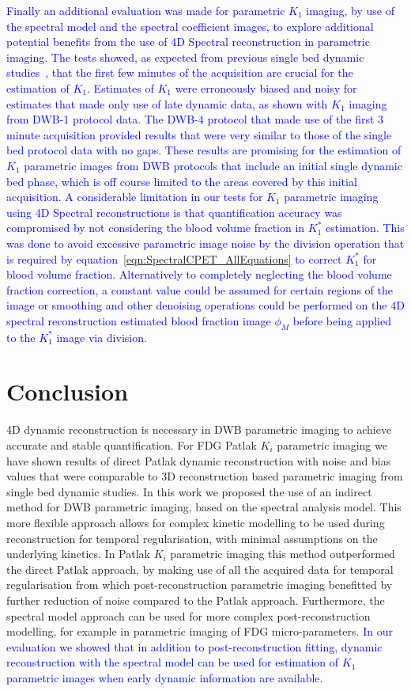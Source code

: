 \textcolor{blue}{
Finally an additional evaluation was made for parametric $K_1$ imaging, by use of the spectral model and the spectral coefficient images, to explore additional potential benefits from the use of 4D Spectral reconstruction in parametric imaging. The tests showed, as expected from previous single bed dynamic studies~\cite{Meikle1998}, that the first few minutes of the acquisition are crucial for the estimation of $K_1$. Estimates of $K_1$ were erroneously biased and noisy for estimates that made only use of late dynamic data, as shown with $K_1$ imaging from DWB-1 protocol data. The DWB-4 protocol that made use of the first 3 minute acquisition provided results that were very similar to those of the single bed protocol data with no gaps. These results are promising for the estimation of $K_1$ parametric images from DWB protocols that include an initial single dynamic bed phase, which is off course limited to the areas covered by this initial acquisition.
A considerable limitation in our tests for $K_1$ parametric imaging using 4D Spectral reconstructions is that quantification accuracy was compromised by not considering the blood volume fraction in $K_1^*$ estimation. This was done to avoid excessive parametric image noise by the division operation that is required by equation~\ref{eqn:SpectralCPET_AllEquations} to correct $K_1^*$ for blood volume fraction. 
Alternatively to completely neglecting the blood volume fraction correction, a constant value could be assumed for certain regions of the image or smoothing and other denoising operations could be performed on the 4D spectral reconstruction estimated blood fraction image $\phi_M$ before being applied to the $K_1^*$ image via division.}

\section*{Conclusion}
4D dynamic reconstruction is necessary in DWB parametric imaging to achieve accurate and stable quantification. For FDG Patlak $K_i$ parametric imaging we have shown results of direct Patlak dynamic reconstruction with noise and bias values that were comparable to 3D reconstruction based parametric imaging from single bed dynamic studies. 
In this work we proposed the use of an indirect method for DWB parametric imaging, based on the spectral analysis model. This more flexible approach allows for complex kinetic modelling to be used during reconstruction for temporal regularisation, with minimal assumptions on the underlying kinetics. In Patlak $K_i$ parametric imaging this method outperformed the direct Patlak approach, by making use of all the acquired data for temporal regularisation from which post-reconstruction parametric imaging benefitted by further reduction of noise compared to the Patlak approach. Furthermore, the spectral model approach can be used for more complex post-reconstruction modelling, for example in parametric imaging of FDG micro-parameters.
\textcolor{blue}{In our evaluation we showed that in addition to post-reconstruction fitting, dynamic reconstruction with the spectral model can be used for estimation of $K_1$ parametric images when early dynamic information are available.}

